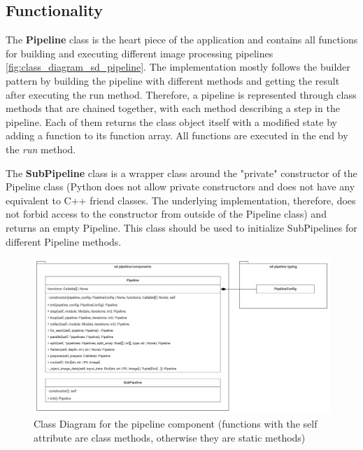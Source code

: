 \subsection{Functionality}
\label{subch:functionality}

The \textbf{Pipeline} class is the heart piece of the application and contains all functions for building and executing different image processing pipelines \autoref{fig:class_diagram_sd_pipeline}. The implementation mostly follows the builder pattern \cite{10.5555/186897} by building the pipeline with different methods and getting the result after executing the run method. Therefore, a pipeline is represented through class methods that are chained together, with each method describing a step in the pipeline. Each of them returns the class object itself with a modified state by adding a function to its function array. All functions are executed in the end by the \textit{run} method. 

The \textbf{SubPipeline} class is a wrapper class around the "private" constructor of the Pipeline class (Python does not allow private constructors and does not have any equivalent to C++ friend classes. The underlying implementation, therefore, does not forbid access to the constructor from outside of the Pipeline class) and returns an empty Pipeline. This class should be used to initialize SubPipelines for different Pipeline methods.

\begin{figure}[H]
  \centering
  \includegraphics[width=\textwidth]{figures/own_work/pipeline/class_diagram_sd-pipeline_components.pdf}
  \caption{Class Diagram for the pipeline component (functions with the self attribute are class methods, otherwise they are static methods)}
  \label{fig:class_diagram_sd_pipeline}
  \clearpage
\end{figure}



